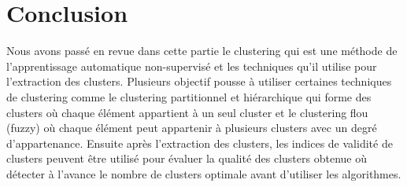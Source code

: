 \section{Conclusion}
Nous avons passé en revue dans cette partie le clustering qui est une méthode de l’apprentissage automatique non-supervisé et les techniques qu’il utilise pour l’extraction des clusters. Plusieurs objectif pousse à utiliser certaines techniques de clustering comme le clustering partitionnel et hiérarchique qui forme des clusters où chaque élément appartient à un seul cluster et le clustering flou (fuzzy) où chaque élément peut appartenir à plusieurs clusters avec un degré d’appartenance. Ensuite après l’extraction des clusters, les indices de validité de clusters peuvent être utilisé pour évaluer la qualité des clusters obtenue où détecter à l’avance le nombre de clusters optimale avant d’utiliser les algorithmes.